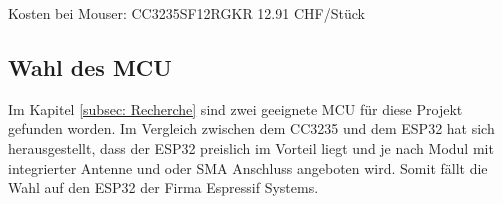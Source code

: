 Kosten bei Mouser:
CC3235SF12RGKR 12.91 CHF/Stück

\subsection{Wahl des MCU}
 
 Im Kapitel \ref{subsec: Recherche} sind zwei geeignete MCU für diese Projekt gefunden worden. Im Vergleich zwischen dem CC3235 und dem ESP32 hat sich herausgestellt, dass der ESP32 preislich im Vorteil liegt und je nach Modul mit integrierter Antenne und oder SMA Anschluss angeboten wird. Somit fällt die Wahl auf den ESP32 der Firma Espressif Systems.
